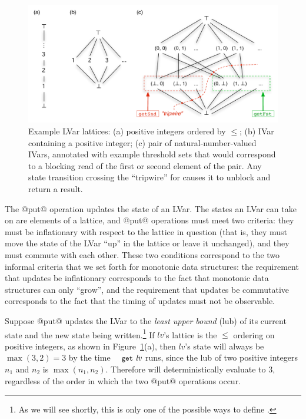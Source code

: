 \begin{figure}
\centering
\includegraphics[width=5in]{chapter2/figures/lvars-example-lattices.pdf} 
  \caption{Example LVar lattices: (a) positive integers ordered by
    $\leq$; (b) IVar containing a positive integer; (c) pair of
    natural-number-valued IVars, annotated with example threshold sets
    that would correspond to a blocking read of the first or second
    element of the pair.  Any state transition crossing the
    ``tripwire'' for  causes it to unblock and return
    a result.}
  \label{f:lvars-example-lattices}
\end{figure}

The @put@ operation updates the state of an LVar.  The states an LVar
can take on are elements of a lattice, and @put@ operations must meet
two criteria: they must be inflationary with respect to the lattice in
question (that is, they must move the state of the LVar ``up'' in the
lattice or leave it unchanged), and they must commute with each other.
These two conditions correspond to the two informal criteria that we
set forth for monotonic data structures: the requirement that updates
be inflationary corresponds to the fact that monotonic data structures
can only ``grow'', and the requirement that updates be commutative
corresponds to the fact that the timing of updates must not be
observable.

Suppose @put@ updates the LVar to the \emph{least upper bound} (lub)
of its current state and the new state being written.\footnote{As we
  will see shortly, this is only one of the possible ways to define
  .}  If $\mathit{lv}$'s lattice is the $\leq$ ordering on
positive integers, as shown in
Figure~\ref{f:lvars-example-lattices}(a), then $\mathit{lv}$'s state
will always be $\max(3, 2) = 3$ by the time $\GET~\mathit{lv}$ runs,
since the lub of two positive integers $n_1$ and $n_2$ is $\max(n_1,
n_2)$.  Therefore  will deterministically
evaluate to $3$, regardless of the order in which the two @put@
operations occur.

